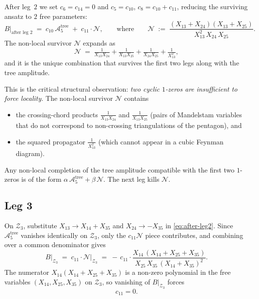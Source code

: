 \documentclass[11pt]{article}
\theoremstyle{plain}
\theoremstyle{definition}
\newcommand{\cA}{\mathcal{A}}
\newcommand{\cZ}{\mathcal{Z}}
\newcommand{\cN}{\mathcal{N}}
\begin{document}
After leg~$2$ we set $c_6 = c_{14} = 0$ and $c_5 = c_{10}$, $c_8 = c_{10} + c_{11}$,
reducing the surviving ansatz to $2$ free parameters:
\begin{equation}
B\Big|_{\text{after leg 2}}
\;=\; c_{10}\, \cA_5^{\text{tree}}
\;+\; c_{11} \cdot \cN,
\qquad\text{where}\qquad
\cN \;:=\; \frac{(X_{13} + X_{24})(X_{13} + X_{25})}{X_{13}^{2}\, X_{24}\, X_{25}}.
\label{eq:after-leg2}
\end{equation}
The non-local survivor $\cN$ expands as
\[
\cN \;=\; \tfrac{1}{X_{13} X_{24}} + \tfrac{1}{X_{13} X_{25}}
         + \tfrac{1}{X_{24} X_{25}} + \tfrac{1}{X_{13}^2},
\]
and it is the unique combination that survives the first two legs along with the
tree amplitude.

This is the critical structural observation: \emph{two cyclic $1$-zeros are
insufficient to force locality.} The non-local survivor $\cN$ contains
\begin{itemize}[nosep,topsep=2pt]
 \item the crossing-chord products $\tfrac{1}{X_{13} X_{24}}$ and $\tfrac{1}{X_{13} X_{25}}$
       (pairs of Mandelstam variables that do not correspond to non-crossing
       triangulations of the pentagon), and
 \item the squared propagator $\tfrac{1}{X_{13}^2}$ (which cannot appear in a cubic
       Feynman diagram).
\end{itemize}
Any non-local completion of the tree amplitude compatible with the first two
$1$-zeros is of the form $\alpha\, \cA_5^{\text{tree}} + \beta\, \cN$. The next leg kills $\cN$.

\subsection{Leg 3}

On $\cZ_3$, substitute $X_{13} \to X_{14} + X_{35}$ and $X_{24} \to -X_{35}$ in
\eqref{eq:after-leg2}. Since $\cA_5^{\text{tree}}$ vanishes identically on $\cZ_3$,
only the $c_{11}\cN$ piece contributes, and combining over a common denominator gives
\[
B \big|_{\cZ_3}
\;=\; c_{11} \cdot \cN\big|_{\cZ_3}
\;=\; -\, c_{11} \cdot \frac{X_{14}\,(X_{14} + X_{25} + X_{35})}
                               {X_{25}\,X_{35}\,(X_{14}+X_{35})^{2}}.
\]
The numerator $X_{14}(X_{14} + X_{25} + X_{35})$ is a non-zero polynomial in the free
variables $(X_{14}, X_{25}, X_{35})$ on $\cZ_3$, so vanishing of $B\big|_{\cZ_3}$
forces
\begin{equation}
c_{11} = 0.
\label{eq:leg3}
\end{equation}
\end{document}
